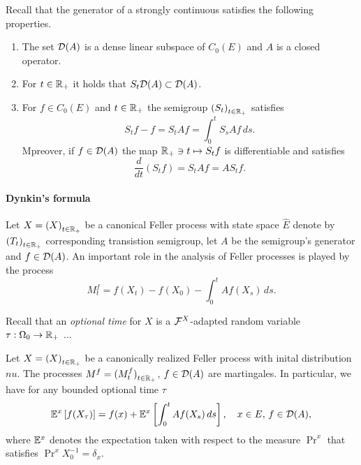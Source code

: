\documentclass[../Master.tex]{subfiles}
\begin{document}
\begin{nrremark}\label{rem:generator}
  Recall that the generator of a strongly continuous satisfies the following properties.
  \begin{enumerate}[label = (\roman*)]
    \item The set \(\mathcal{D}(A)\) is a dense linear subspace of \(C_0(E)\) and \(A\) is a closed operator.
    \item For \(t \in \mathbb{R}_+\) it holds that \(S_t \mathcal{D}(A) \subset \mathcal{D}(A)\).
    \item\label{item:forward_backward_equations} For \(f \in C_0(E)\) and \(t \in \mathbb{R}_+\) the semigroup \({(S_t)}_{t \in \mathbb{R}_+}\) satisfies
    \begin{equation}
      S_t f - f = S_t A f = \int_0^t S_s A f \, ds.
    \end{equation}
    Mpreover, if \(f \in \mathcal{D}(A)\) the map \(\mathbb{R}_+ \ni t \mapsto S_t f\) is differentiable and satisfies
    \begin{equation}
      \frac{d}{dt} (S_t f) = S_t A f = A S_t f.
    \end{equation}
  \end{enumerate}
\end{nrremark}


\paragraph{Dynkin's formula}
Let \(X = {(X)}_{t \in \mathbb{R}_+}\) be a canonical Feller process with state space \(\hat{E}\) denote by \({(T_t)}_{t \in \mathbb{R}_+}\) corresponding transistion semigroup, let \(A\) be the semigroup's generator and \(f \in \mathcal{D}(A)\). An important role in the analysis of Feller processes is played by the process
\begin{equation}
  M_t^f = f(X_t) - f(X_0) - \int_0^t Af(X_s) \, ds.
\end{equation}

Recall that an \emph{optional time} for  \(X\) is a \(\mathcal{F}^X\)-adapted random variable \(\tau: \Omega_0 \to \mathbb{R}_+\) ...

\begin{lemma}
  Let \(X = {(X)}_{t \in \mathbb{R}_+}\) be a canonically realized Feller process with inital distribution \(nu{}\). The processes \(M^f = {(M_t^f)}_{t \in \mathbb{R}_+}\), \(f \in \mathcal{D}(A)\) are martingales. In particular, we have for any bounded optional time \(\tau{}\)
  \begin{equation}\label{eq:Dynkin_formula}
    \mathbb{E}^x \left[ f(X_\tau) \right] = f(x) + \mathbb{E}^x \left[ \int_0^t Af(X_s) \, ds \right], \quad x \in E, \, f \in \mathcal{D}(A),
  \end{equation} 
  where \(\mathbb{E}^x\) denotes the expectation taken with respect to the measure \(\Pr^x\) that satisfies \(\Pr^x X_0^{-1} = \delta_x\).
\end{lemma}
\end{document}
